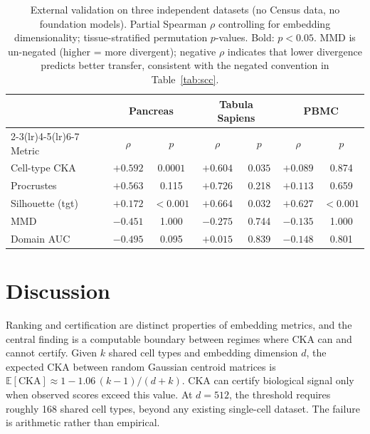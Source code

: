 \documentclass[11pt]{article}
\begin{document}
\begin{table}[t]
\centering
\caption{External validation on three independent datasets (no Census
data, no foundation models). Partial Spearman $\rho$ controlling for
embedding dimensionality; tissue-stratified permutation $p$-values.
Bold: $p < 0.05$. MMD is un-negated (higher = more divergent);
negative $\rho$ indicates that lower divergence predicts better
transfer, consistent with the negated convention in
Table~\ref{tab:scc}.}
\label{tab:external}
\small
\begin{tabular}{@{}lcccccc@{}}
\toprule
& \multicolumn{2}{c}{Pancreas} & \multicolumn{2}{c}{Tabula Sapiens} & \multicolumn{2}{c}{PBMC} \\
\cmidrule(lr){2-3}\cmidrule(lr){4-5}\cmidrule(lr){6-7}
Metric & $\rho$ & $p$ & $\rho$ & $p$ & $\rho$ & $p$ \\
\midrule
Cell-type CKA & $+0.592$ & $\mathbf{0.0001}$ & $+0.604$ & $\mathbf{0.035}$ & $+0.089$ & 0.874 \\
Procrustes    & $+0.563$ & 0.115              & $+0.726$ & 0.218             & $+0.113$ & 0.659 \\
\midrule
Silhouette (tgt) & $+0.172$ & $\mathbf{<0.001}$ & $+0.664$ & $\mathbf{0.032}$ & $+0.627$ & $\mathbf{<0.001}$ \\
MMD              & $-0.451$ & 1.000              & $-0.275$ & 0.744             & $-0.135$ & 1.000 \\
Domain AUC       & $-0.495$ & 0.095              & $+0.015$ & 0.839             & $-0.148$ & 0.801 \\
\bottomrule
\end{tabular}
\end{table}


\section{Discussion}
\label{sec:discussion}

Ranking and certification are distinct properties of embedding metrics,
and the central finding is a computable boundary between regimes where
CKA can and cannot certify. Given $k$ shared cell types and embedding
dimension $d$, the expected CKA between random Gaussian centroid
matrices is $\mathbb{E}[\mathrm{CKA}] \approx 1 -
1.06\,(k{-}1)/(d{+}k)$. CKA can certify biological signal only when
observed scores exceed this value. At $d = 512$, the threshold requires
roughly 168 shared cell types, beyond any existing single-cell dataset.
The failure is arithmetic rather than empirical.
\end{document}
